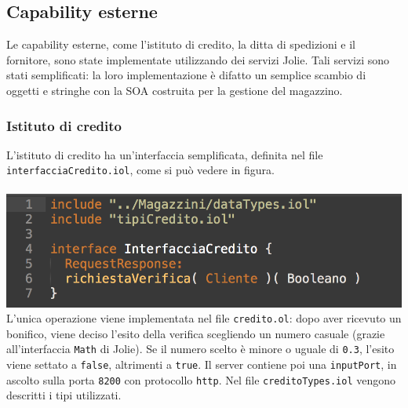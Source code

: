 \subsection{Capability esterne}
Le capability esterne, come l'istituto di credito, la ditta di
spedizioni e il fornitore, sono state implementate utilizzando dei
servizi Jolie. Tali servizi sono stati semplificati: la loro
implementazione \`e difatto un semplice scambio di oggetti e stringhe
con la SOA costruita per la gestione del magazzino.

\subsubsection*{Istituto di credito}
L'istituto di credito ha un'interfaccia semplificata, definita nel file
{\tt interfacciaCredito.iol}, come si pu\`o vedere in figura. \\\\
\includegraphics[scale=0.5]{immagini/interfCredito.png}\\
L'unica operazione viene implementata nel file {\tt credito.ol}:
dopo aver ricevuto un bonifico, viene deciso l'esito della verifica
scegliendo un numero casuale (grazie all'interfaccia {\tt Math} di
Jolie). Se il numero scelto \`e minore o uguale di {\tt 0.3}, l'esito
viene settato a {\tt false}, altrimenti a {\tt true}.
Il server contiene poi una {\tt inputPort}, in ascolto sulla porta
{\tt 8200} con protocollo {\tt http}.
Nel file {\tt creditoTypes.iol} vengono descritti i tipi utilizzati.


